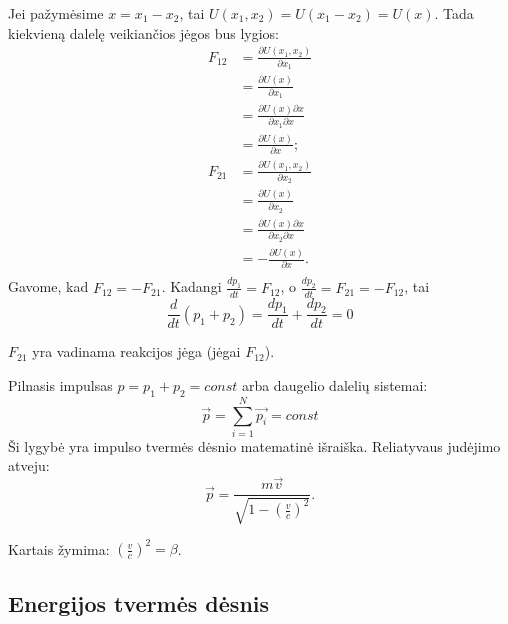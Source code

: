 Jei pažymėsime $x = x_{1} - x_{2}$, tai
$U(x_{1}, x_{2}) = U(x_{1}-x_{2}) = U(x)$. Tada kiekvieną
dalelę veikiančios jėgos bus lygios:
\begin{align*}
  F_{12}
  &= \frac{\partial U(x_{1}, x_{2})}{\partial x_{1}} \\
  &= \frac{\partial U(x)}{\partial x_{1}} \\
  &= \frac{\partial U(x)\partial x}{\partial x_{1} \partial x} \\
  &= \frac{\partial U(x)}{\partial x}; \\
  F_{21}
  &= \frac{\partial U(x_{1}, x_{2})}{\partial x_{2}} \\
  &= \frac{\partial U(x)}{\partial x_{2}} \\
  &= \frac{\partial U(x)\partial x}{\partial x_{2} \partial x} \\
  &= -\frac{\partial U(x)}{\partial x}. \\
\end{align*}
Gavome, kad $F_{12} = -F_{21}$. Kadangi $\frac{dp_{1}}{dt} = F_{12}$,
o $\frac{dp_{2}}{dt} = F_{21} = -F_{12}$, tai
\begin{equation*}
  \frac{d}{dt}(p_{1} + p_{2}) = \frac{dp_{1}}{dt} + \frac{dp_{2}}{dt} = 0
\end{equation*}

$F_{21}$ yra vadinama reakcijos jėga (jėgai $F_{12}$).

Pilnasis impulsas $p = p_{1} + p_{2} = const$ arba daugelio
dalelių sistemai:
\begin{equation*}
  \vec{p} = \sum ^{N} _{i = 1} \vec{p_{i}} = const
\end{equation*}
Ši lygybė yra impulso tvermės dėsnio matematinė išraiška. Reliatyvaus
judėjimo atveju:
\begin{equation*}
  \vec{p} = \frac{m\vec{v}}{\sqrt{1 - \left( \frac{v}{c} \right)^{2}}}.
\end{equation*}

\begin{note}
  Kartais žymima: $\left( \frac{v}{c} \right)^{2} = \beta$.
\end{note}

\subsection{Energijos tvermės dėsnis}

